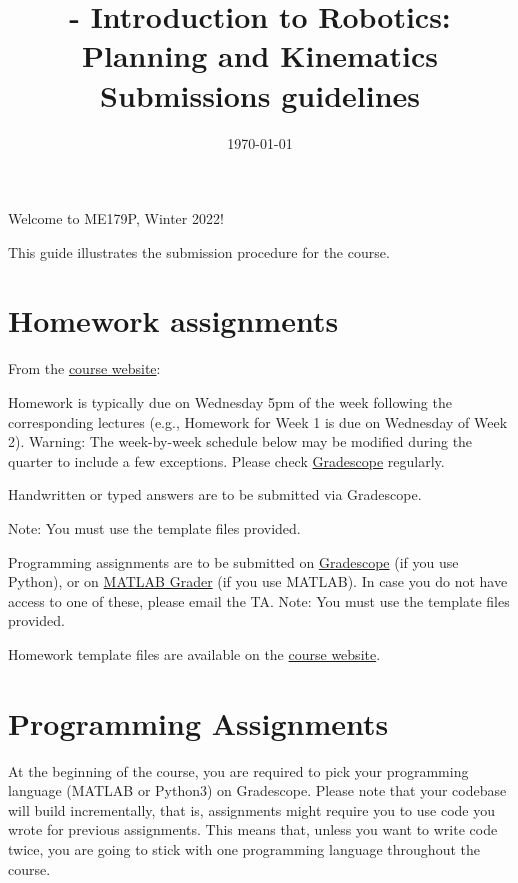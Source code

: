 \documentclass[11pt, reqno]{amsart} %
\title[\CourseN - Submissions guidelines]{\CourseN - Introduction to Robotics: Planning and Kinematics\\\vspace{0.5cm}\small{Submissions guidelines}}
\author{\myname}
\date{\today}
\newcommand{\website}{http://motion.me.ucsb.edu/ME179P-Winter2022/index.html}
\newcommand{\gradescope}{https://www.gradescope.com/courses/219666}
\newcommand{\mgrader}{https://grader.mathworks.com/courses/64655-me-ece179p-winter-2022-ucsb}
\begin{document}
\maketitle


Welcome to ME179P, Winter 2022!

This guide illustrates the submission procedure for the course.

\section{Homework assignments}

From the \href{\website}{course website}:

\begin{tcolorbox}

Homework is typically due on Wednesday 5pm of the week following the
corresponding lectures (e.g., Homework for Week 1 is due on Wednesday of
Week 2).  Warning: The week-by-week schedule below may be modified during
the quarter to include a few exceptions.
Please check \href{\gradescope}{Gradescope} regularly.

Handwritten or typed answers are to be submitted via Gradescope.

Note: You must use the template files provided.

Programming assignments are to be submitted on
\href{\gradescope}{Gradescope} (if you use Python),
or on \href{\mgrader}{MATLAB Grader}
(if you use MATLAB).
In case you do not have access to one of these, please email the TA.
Note: You must use the template files provided.

\end{tcolorbox}

Homework template files are available on the \href{\website}{course website}.

\section{Programming Assignments}

At the beginning of the course, you are required to pick your programming language (MATLAB or Python3) on Gradescope.
Please note that your codebase will build incrementally, that is, assignments might require you
to use code you wrote for previous assignments.
This means that, unless you want to write code twice, you are going to stick with one programming language throughout the course.
\end{document}
